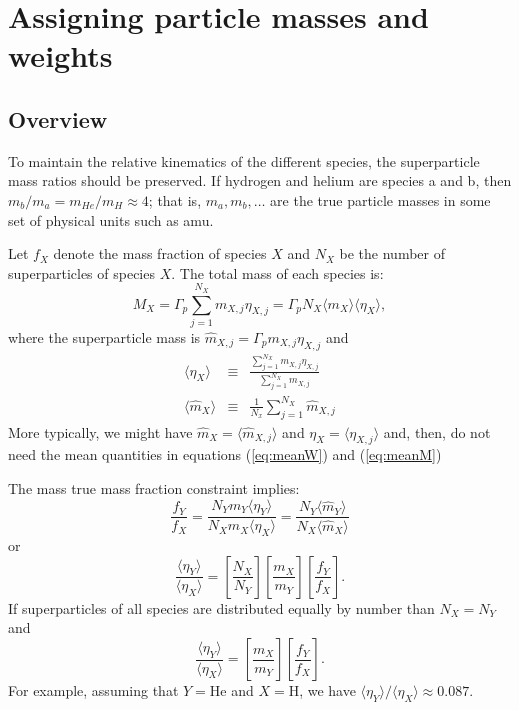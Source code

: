 \documentclass[12pt]{article}
\begin{document}
\section{Assigning particle masses and weights}

\subsection{Overview}

To maintain the relative kinematics of the different species, the
superparticle mass ratios should be preserved.  If hydrogen and helium
are species a and b, then $m_b/m_a = m_{He}/m_H \approx 4$; that is,
$m_a, m_b, \ldots$ are the true particle masses in some set of
physical units such as amu.

Let $f_X$ denote the mass fraction of species $X$ and $N_X$ be the
number of superparticles of species $X$.  The total mass of each
species is:
\begin{equation}
  M_X = \Gamma_p \sum_{j=1}^{N_X} m_{X,j} \eta_{X,j} = 
  \Gamma_p N_X \langle{m}_X\rangle \langle\eta_X\rangle,
\end{equation}
where the superparticle mass is ${\hat m}_{X,j} = \Gamma_p m_{X,j}
\eta_{X,j}$ and
\begin{eqnarray}
  \langle\eta_X\rangle &\equiv& \frac{\sum_{j=1}^{N_X} m_{X,j}
    \eta_{X,j}}{\sum_{j=1}^{N_X} m_{X,j}} \label{eq:meanW} \\
  \langle{\hat{m}}_X\rangle &\equiv& \frac{1}{N_x} \sum_{j=1}^{N_X} \hat{m}_{X,j}
  \label{eq:meanM}
\end{eqnarray}
More typically, we might have $\hat{m}_X = \langle \hat{m}_{X,j}\rangle$ and
$\eta_X = \langle\eta_{X,j}\rangle$ and, then, do not need the mean
quantities in equations (\ref{eq:meanW}) and (\ref{eq:meanM})

The mass true mass fraction constraint implies:
\begin{equation}
\frac{f_Y}{f_X} = \frac{N_Y m_Y \langle\eta_Y\rangle}{N_X m_X \langle\eta_X\rangle}
=
\frac{N_Y \langle\hat{m}_Y\rangle}{N_X \langle\hat{m}_X\rangle}
\end{equation}
or
\begin{equation}
\frac{\langle\eta_Y\rangle}{\langle\eta_X\rangle} = 
\left[\frac{N_X}{N_Y}\right]
\left[\frac{m_X}{m_Y}\right] \left[\frac{f_Y}{f_X}\right].
\end{equation}
If superparticles of all species are distributed equally by number
than $N_X=N_Y$ and
\begin{equation}
  \frac{\langle\eta_Y\rangle}{\langle\eta_X\rangle} = 
  \left[\frac{m_X}{m_Y}\right]
  \left[\frac{f_Y}{f_X}\right].
\end{equation}
For example, assuming that $Y=\mbox{He}$ and $X=\mbox{H}$, we have
$\langle\eta_Y\rangle/\langle\eta_X\rangle \approx 0.087$.
\end{document}
